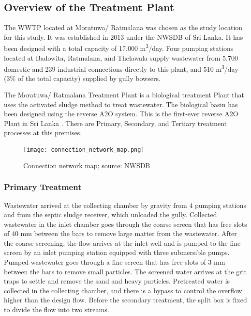 \subsection{Overview of the Treatment Plant}

The \ac{WWTP} located at Moratuwa/ Ratmalana was chosen as the study location for this study. It was established in 2013 under the \ac{NWSDB} of Sri Lanka. It has been designed with a total capacity of 17,000 \unit{m^3}/day. Four pumping stations located at Badowita, Ratmalana, and Thelawala supply wastewater from 5,700 domestic and 239 industrial connections directly to this plant, and 510 \unit{m^3}/day (3\% of the total capacity) supplied by gully bowsers.

The Moratuwa/ Ratmalana Treatment Plant is a biological treatment Plant that uses the activated sludge method to treat wastewater. The biological basin has been designed using the reverse A2O system. This is the first-ever reverse A2O Plant in Sri Lanka \cite{Danushika2016}. There are Primary, Secondary, and Tertiary treatment processes at this premises. 

\begin{figure}[H]
\centering
\texttt{[image: connection\_network\_map.png]}
\caption{Connection network map; source: \ac{NWSDB}}
\label{fig:connection_network_map}
\end{figure}



\subsubsection{Primary Treatment}
Wastewater arrived at the collecting chamber by gravity from 4 pumping stations and from the septic sludge receiver, which unloaded the gully. Collected wastewater in the inlet chamber goes through the coarse screen that has free slots of 40 mm between the bars to remove large matter from the wastewater. After the coarse screening, the flow arrives at the inlet well and is pumped to the fine screen by an inlet pumping station equipped with three submersible pumps. Pumped wastewater goes through a fine screen that has free slots of 3 mm between the bars to remove small particles. The screened water arrives at the grit traps to settle and remove the sand and heavy particles. Pretreated water is collected in the collecting chamber, and there is a bypass to control the overflow higher than the design flow. Before the secondary treatment, the split box is fixed to divide the flow into two streams.

